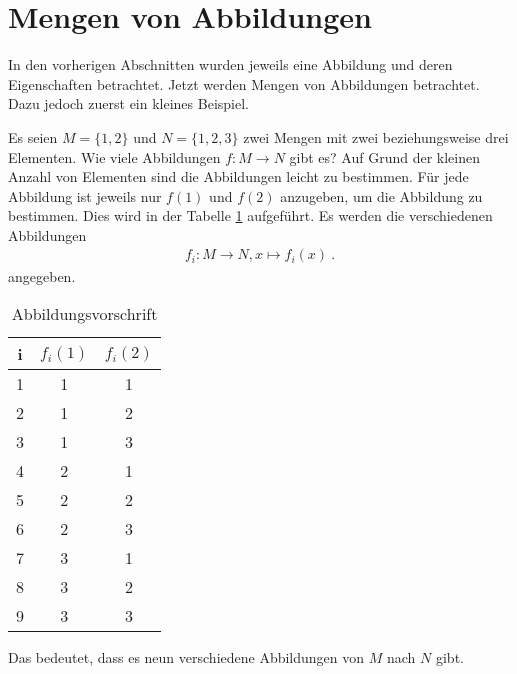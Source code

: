\section{Mengen von Abbildungen}
\label{sec:Abbildungen:Mengen von Abbildungen}

\begin{Unit}[Anmerkung] 
In den vorherigen Abschnitten wurden jeweils eine Abbildung und deren 
Eigenschaften betrachtet. Jetzt werden Mengen von Abbildungen betrachtet. 
Dazu jedoch zuerst ein kleines Beispiel.
\end{Unit} 

\begin{Unit}[Beispiel] 
  Es seien $M = \{1,2\}$ und $N = \{1,2,3\}$ zwei Mengen mit zwei 
  beziehungsweise drei Elementen. Wie viele Abbildungen $f:M \rightarrow N$ 
  gibt es? Auf Grund der kleinen Anzahl von Elementen sind die Abbildungen 
  leicht zu bestimmen. Für jede Abbildung ist jeweils nur $f(1)$ und $f(2)$ 
  anzugeben, um die Abbildung zu bestimmen. Dies wird in der Tabelle 
  \ref{tbl:abb:Abbildungsvorschrift} aufgeführt. Es werden die verschiedenen 
  Abbildungen
  \begin{align}
    f_i : M \rightarrow N, x \mapsto f_i(x) \ .
  \end{align}
  angegeben.

  \begin{table}\begin{center}
    \begin{tabular} {c || c | c }
      i & $f_i(1)$ & $f_i(2)$ \\ \hline
      1 & 1 & 1 \\
      2 & 1 & 2 \\
      3 & 1 & 3 \\
      4 & 2 & 1 \\
      5 & 2 & 2 \\
      6 & 2 & 3 \\
      7 & 3 & 1 \\
      8 & 3 & 2 \\
      9 & 3 & 3 \\
    \end{tabular}
    \caption{Abbildungsvorschrift}
    \label{tbl:abb:Abbildungsvorschrift}
  \end{center} \end{table}

  Das bedeutet, dass es neun verschiedene Abbildungen von $M$ nach $N$ gibt.
\end{Unit}

